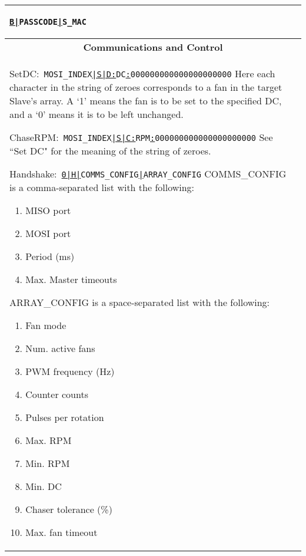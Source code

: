 \documentclass{article}
\begin{document}
\begin{center}
\begin{longtable}{| p{} | p{} |}
\begin{itemize}
		\linebreak\texttt{\underline{B|}PASSCODE\underline{|}S\_MAC}
	\end{itemize}
	\\
	\hline
	\multicolumn{2}{|c|}{\textbf{Communications and Control}}\\*
	\hline
	\begin{itemize}
	{\scriptsize
		\item {Set\hspace{.5em}DC:}\
		\linebreak\texttt{MOSI\_INDEX\underline{|S|D:}DC\underline{:}000000000000000000000}
		\linebreak Here each character in the string of zeroes corresponds to a fan in the
		target Slave's array. A `1' means the fan is to be set to the specified DC, and 
		a `0' means it is to be left unchanged.
		\item {Chase\hspace{.5em}RPM:}\
		\linebreak\texttt{MOSI\_INDEX\underline{|S|C:}RPM\underline{:}000000000000000000000}
		\linebreak See ``Set DC" for the meaning of the string of zeroes.
		\item {Handshake:}\
		\linebreak\texttt{\underline{0|H|}COMMS\_CONFIG\underline{|}ARRAY\_CONFIG}
		\linebreak COMMS\_CONFIG is a comma-separated list with the following:
		\begin{enumerate}
			\item MISO port
			\item MOSI port
			\item Period (ms)
			\item Max. Master timeouts
		\end{enumerate}
		ARRAY\_CONFIG is a space-separated list with the following:
		\begin{enumerate}
			\item Fan mode
			\item Num. active fans
			\item PWM frequency (Hz)
			\item Counter counts
			\item Pulses per rotation 
			\item Max. RPM
			\item Min. RPM
			\item Min. DC
			\item Chaser tolerance (\%)
			\item Max. fan timeout

\end{enumerate}}
\end{itemize}
\end{longtable}
\end{center}
\end{document}
